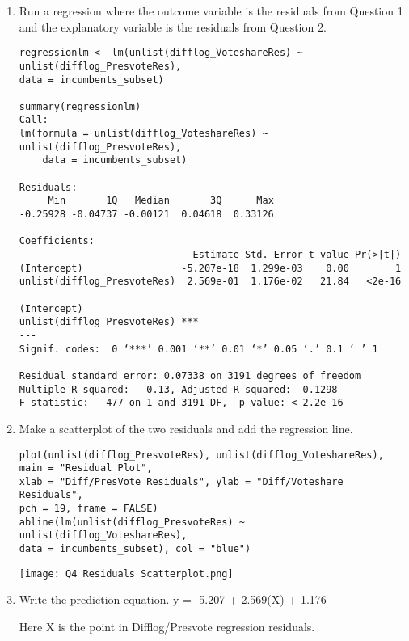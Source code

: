 \documentclass[12pt,letterpaper]{article}
\begin{document}
	\begin{enumerate}
		\item Run a regression where the outcome variable is the residuals from Question 1 and the explanatory variable is the residuals from Question 2.	
  \begin{verbatim}
regressionlm <- lm(unlist(difflog_VoteshareRes) ~ unlist(difflog_PresvoteRes), 
data = incumbents_subset)

summary(regressionlm)
Call:
lm(formula = unlist(difflog_VoteshareRes) ~ unlist(difflog_PresvoteRes), 
    data = incumbents_subset)

Residuals:
     Min       1Q   Median       3Q      Max 
-0.25928 -0.04737 -0.00121  0.04618  0.33126 

Coefficients:
                              Estimate Std. Error t value Pr(>|t|)
(Intercept)                 -5.207e-18  1.299e-03    0.00        1
unlist(difflog_PresvoteRes)  2.569e-01  1.176e-02   21.84   <2e-16
                               
(Intercept)                    
unlist(difflog_PresvoteRes) ***
---
Signif. codes:  0 ‘***’ 0.001 ‘**’ 0.01 ‘*’ 0.05 ‘.’ 0.1 ‘ ’ 1

Residual standard error: 0.07338 on 3191 degrees of freedom
Multiple R-squared:   0.13,	Adjusted R-squared:  0.1298 
F-statistic:   477 on 1 and 3191 DF,  p-value: < 2.2e-16

  \end{verbatim}
		\item Make a scatterplot of the two residuals and add the regression line. 	
  \begin{verbatim}
plot(unlist(difflog_PresvoteRes), unlist(difflog_VoteshareRes), 
main = "Residual Plot",
xlab = "Diff/PresVote Residuals", ylab = "Diff/Voteshare Residuals",
pch = 19, frame = FALSE)
abline(lm(unlist(difflog_PresvoteRes) ~ unlist(difflog_VoteshareRes), 
data = incumbents_subset), col = "blue")

  \end{verbatim}

\texttt{[image: Q4 Residuals Scatterplot.png]}


		\item Write the prediction equation.
y = -5.207 + 2.569(X) + 1.176

Here X is the point in Difflog/Presvote regression residuals.

	\end{enumerate}
	
	\newpage	
\end{document}
